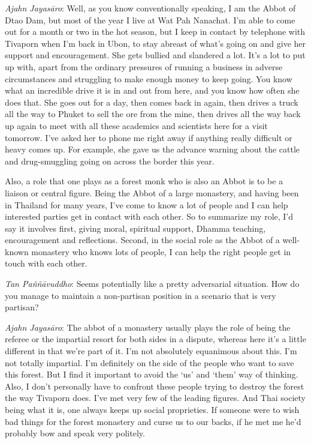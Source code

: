 \emph{Ajahn Jayasāro}: Well, as you know conventionally speaking, I am
the Abbot of Dtao Dam, but most of the year I live at Wat Pah Nanachat. 
I'm able to come out for a month or two in the hot season, but I keep in
contact by telephone with Tivaporn when I'm back in Ubon, to stay
abreast of what's going on and give her support and encouragement. She
gets bullied and slandered a lot. It's a lot to put up with, apart from
the ordinary pressures of running a business in adverse circumstances
and struggling to make enough money to keep going. You know what an
incredible drive it is in and out from here, and you know how often she
does that. She goes out for a day, then comes back in again, then drives
a truck all the way to Phuket to sell the ore from the mine, then drives
all the way back up again to meet with all these academics and
scientists here for a visit tomorrow. I've asked her to phone me right
away if anything really difficult or heavy comes up. For example, she
gave us the advance warning about the cattle and drug-smuggling going on
across the border this year. 

Also, a role that one plays as a forest monk who is also an Abbot is to
be a liaison or central figure. Being the Abbot of a large monastery, 
and having been in Thailand for many years, I've come to know a lot of
people and I can help interested parties get in contact with each other. 
So to summarize my role, I'd say it involves first, giving moral, 
spiritual support, Dhamma teaching, encouragement and reflections. 
Second, in the social role as the Abbot of a well-known monastery who
knows lots of people, I can help the right people get in touch with each
other. 

\emph{Tan Paññāvuddho}: Seems potentially like a pretty adversarial
situation. How do you manage to maintain a non-partisan position in a
scenario that is very partisan? 

\emph{Ajahn Jayasāro}: The abbot of a monastery usually plays the role
of being the referee or the impartial resort for both sides in a
dispute, whereas here it's a little different in that we're part of it. 
I'm not absolutely equanimous about this. I'm not totally impartial. I'm
definitely on the side of the people who want to save this forest. But I
find it important to avoid the `us' and `them' way of thinking. Also, I
don't personally have to confront these people trying to destroy the
forest the way Tivaporn does. I've met very few of the leading figures. 
And Thai society being what it is, one always keeps up social
proprieties. If someone were to wish bad things for the forest monastery
and curse us to our backs, if he met me he'd probably bow and speak very
politely. 

